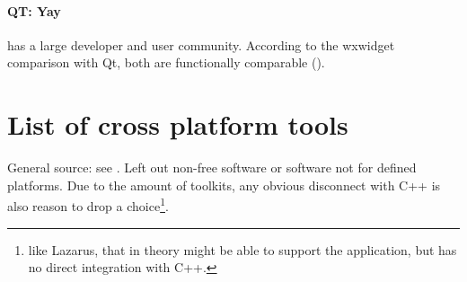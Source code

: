 \paragraph{QT: Yay} has a large developer and user community. According to the
wxwidget comparison with Qt, both are functionally comparable
(\cite{wxwidget:comparison}).


\section{List of cross platform tools}

General source: see \cite{wiki:xplatf}. Left out non-free software or software
not for defined platforms. Due to the amount of toolkits, any obvious disconnect with C++
is also reason to drop a choice\footnote{like Lazarus, that in theory might be able to
support the application, but has no direct integration with C++.}.


